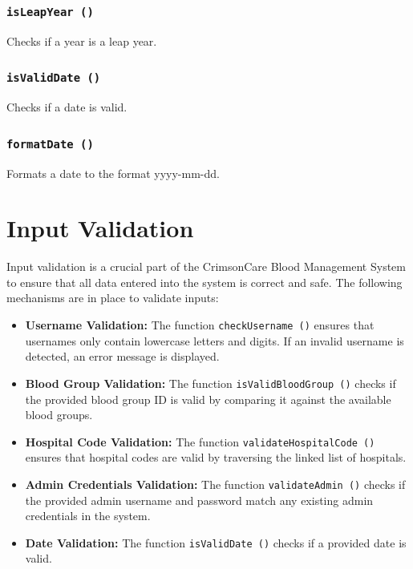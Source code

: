 \documentclass[12pt,a4paper]{report}
\begin{document}
\subsubsection{\texttt{isLeapYear ()}}
Checks if a year is a leap year.


\subsubsection{\texttt{isValidDate ()}}
Checks if a date is valid.


\subsubsection{\texttt{formatDate ()}}
Formats a date to the format yyyy-mm-dd.


\section{Input Validation}
Input validation is a crucial part of the CrimsonCare Blood Management System to ensure that all data
entered into the system is correct and safe. The following mechanisms are in place to validate inputs:

\begin{itemize}
    \item \textbf{Username Validation:} The function \texttt{checkUsername ()} ensures that usernames only contain lowercase letters and digits. If an invalid username is detected, an error message is displayed.
    \item \textbf{Blood Group Validation:} The function \texttt{isValidBloodGroup ()} checks if the provided blood group ID is valid by comparing it against the available blood groups.
    \item \textbf{Hospital Code Validation:} The function \texttt{validateHospitalCode ()} ensures that hospital codes are valid by traversing the linked list of hospitals.
    \item \textbf{Admin Credentials Validation:} The function \texttt{validateAdmin ()} checks if the provided admin username and password match any existing admin credentials in the system.
    \item \textbf{Date Validation:} The function \texttt{isValidDate ()} checks if a provided date is valid.
\end{itemize}
\end{document}

